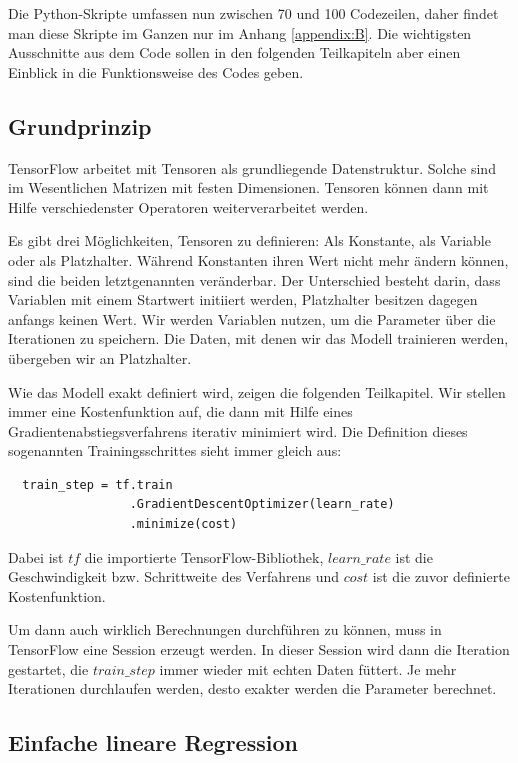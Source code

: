 Die Python-Skripte umfassen nun zwischen 70 und 100 Codezeilen, daher findet man diese Skripte im Ganzen nur im Anhang \ref{appendix:B}. Die wichtigsten Ausschnitte aus dem Code sollen in den folgenden Teilkapiteln aber einen Einblick in die Funktionsweise des Codes geben.

\subsection{Grundprinzip}
\label{subsection:3:3:1}

TensorFlow arbeitet mit Tensoren als grundliegende Datenstruktur. Solche sind im Wesentlichen Matrizen mit festen Dimensionen. Tensoren können dann mit Hilfe verschiedenster Operatoren weiterverarbeitet werden.

Es gibt drei Möglichkeiten, Tensoren zu definieren: Als Konstante, als Variable oder als Platzhalter. Während Konstanten ihren Wert nicht mehr ändern können, sind die beiden letztgenannten veränderbar. Der Unterschied besteht darin, dass Variablen mit einem Startwert initiiert werden, Platzhalter besitzen dagegen anfangs keinen Wert. Wir werden Variablen nutzen, um die Parameter über die Iterationen zu speichern. Die Daten, mit denen wir das Modell trainieren werden, übergeben wir an Platzhalter.

Wie das Modell exakt definiert wird, zeigen die folgenden Teilkapitel. Wir stellen immer eine Kostenfunktion auf, die dann mit Hilfe eines Gradientenabstiegsverfahrens iterativ minimiert wird. Die Definition dieses sogenannten Trainingsschrittes sieht immer gleich aus:

\begin{verbatim}
  train_step = tf.train
                 .GradientDescentOptimizer(learn_rate)
                 .minimize(cost)
\end{verbatim}

Dabei ist $tf$ die importierte TensorFlow-Bibliothek, $learn\_rate$ ist die Geschwindigkeit bzw. Schrittweite des Verfahrens und $cost$ ist die zuvor definierte Kostenfunktion.

Um dann auch wirklich Berechnungen durchführen zu können, muss in TensorFlow eine Session erzeugt werden. In dieser Session wird dann die Iteration gestartet, die $train\_step$ immer wieder mit echten Daten füttert. Je mehr Iterationen durchlaufen werden, desto exakter werden die Parameter berechnet.

\subsection{Einfache lineare Regression}
\label{subsection:3:3:2}

